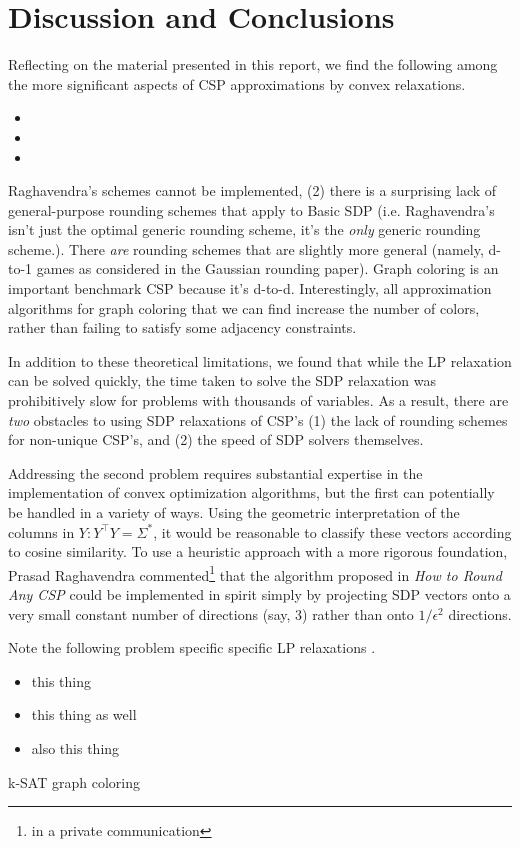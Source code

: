 \section{Discussion and Conclusions}	
	Reflecting on the material presented in this report, we find the following among the more significant aspects of CSP approximations by convex relaxations.
\begin{itemize}
\item
\item
\item
\end{itemize}
	
	 Raghavendra's schemes cannot be implemented, (2) there is a surprising lack of general-purpose rounding schemes that apply to Basic SDP (i.e. Raghavendra's isn't just the optimal generic rounding scheme, it's the \textit{only} generic rounding scheme.). There \textit{are} rounding schemes that are slightly more general (namely, d-to-1 games as considered in the Gaussian rounding paper). Graph coloring is an important benchmark CSP because it's d-to-d. Interestingly, all approximation algorithms for graph coloring that we can find increase the number of colors, rather than failing to satisfy some adjacency constraints. 
	
	In addition to these theoretical limitations, we found that while the LP relaxation can be solved quickly, the time taken to solve the SDP relaxation was prohibitively slow for problems with thousands of variables. As a result, there are \textit{two} obstacles to using SDP relaxations of CSP's (1) the lack of rounding schemes for non-unique CSP's, and (2) the speed of SDP solvers themselves.
	
	Addressing the second problem requires substantial expertise in the implementation of convex optimization algorithms, but the first can potentially be handled in a variety of ways. Using the geometric interpretation of the columns in $Y : Y^\intercal Y = \Sigma^*$, it would be reasonable to classify these vectors according to cosine similarity. To use a heuristic approach with a more rigorous foundation, Prasad Raghavendra commented\footnote{in a private communication} that the algorithm proposed in \textit{How to Round Any CSP} could be implemented in spirit simply by projecting SDP vectors onto a very small constant number of directions (say, 3) rather than onto $1/\epsilon^2$ directions.

Note the following problem specific specific LP relaxations \cite{GoeWil94,Asa97,Yan94}.
\begin{itemize}
\item this thing
\item this thing as well
\item also this thing
\end{itemize}
k-SAT
graph coloring